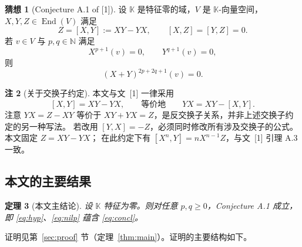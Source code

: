 \documentclass[11pt,UTF8]{ctexart}
\newtheorem{theorem}{定理}[section]
\theoremstyle{definition}
\newtheorem{conjecture}[theorem]{猜想}
\newtheorem{remark}[theorem]{注}
\newcommand{\End}{\operatorname{End}}
\newcommand{\N}{\mathbb{N}}
\newcommand{\K}{\mathbb{K}}
\begin{document}
\begin{conjecture}[{Conjecture A.1 of [1]}]\label{conj:main}
设 $\K$ 是特征零的域，$V$ 是 $\K$-向量空间，$X,Y,Z\in\End(V)$ 满足
\begin{equation}\label{eq:hyp}
Z=[X,Y]:=XY-YX,\qquad [X,Z]=[Y,Z]=0 .
\end{equation}
若 $v\in V$ 与 $p,q\in\N$ 满足
\begin{equation}\label{eq:nilp}
X^{p+1}(v)=0,\qquad Y^{q+1}(v)=0 ,
\end{equation}
则
\begin{equation}\label{eq:concl}
(X+Y)^{2p+2q+1}(v)=0 .
\end{equation}
\end{conjecture}

\begin{remark}[关于交换子约定]\label{rem:conv}
本文与文~[1] 一律采用
\[
[X,Y]=XY-YX,\qquad\text{等价地}\qquad YX=XY-[X,Y].
\]
注意 $YX=Z-XY$ 等价于 $XY+YX=Z$，是反交换子关系，并非上述交换子约定的另一种写法。
若改用 $[Y,X]=-Z$，必须同时修改所有涉及交换子的公式。本文固定 $Z=XY-YX$；
在此约定下有 $[X^n,Y]=nX^{n-1}Z$，与文~[1] 引理 A.3 一致。
\end{remark}

\subsection{本文的主要结果}

\begin{theorem}[本文主结论]\label{thm:main-intro}
设 $\K$ 特征为零。则对任意 $p,q\ge 0$，Conjecture A.1 成立，即 \eqref{eq:hyp}、\eqref{eq:nilp}
蕴含 \eqref{eq:concl}。
\end{theorem}

证明见第~\ref{sec:proof} 节（定理~\ref{thm:main}）。证明的主要结构如下。
\end{document}
